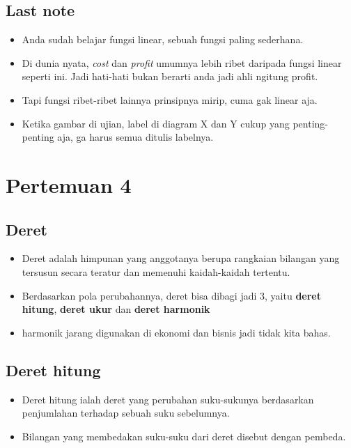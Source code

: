 \documentclass[
  letterpaper,
  DIV=11,
  numbers=noendperiod]{scrartcl}
\begin{document}
\subsection{Last note}\label{last-note}

\begin{itemize}
\item
  Anda sudah belajar fungsi linear, sebuah fungsi paling sederhana.
\item
  Di dunia nyata, \emph{cost} dan \emph{profit} umumnya lebih ribet
  daripada fungsi linear seperti ini. Jadi hati-hati bukan berarti anda
  jadi ahli ngitung profit.
\item
  Tapi fungsi ribet-ribet lainnya prinsipnya mirip, cuma gak linear aja.
\item
  Ketika gambar di ujian, label di diagram X dan Y cukup yang
  penting-penting aja, ga harus semua ditulis labelnya.
\end{itemize}

\section{Pertemuan 4}\label{pertemuan-4}

\subsection{Deret}\label{deret}

\begin{itemize}
\item
  Deret adalah himpunan yang anggotanya berupa rangkaian bilangan yang
  tersusun secara teratur dan memenuhi kaidah-kaidah tertentu.
\item
  Berdasarkan pola perubahannya, deret bisa dibagi jadi 3, yaitu
  \textbf{deret hitung}, \textbf{deret ukur} dan \textbf{deret harmonik}
\item
  harmonik jarang digunakan di ekonomi dan bisnis jadi tidak kita bahas.
\end{itemize}

\subsection{Deret hitung}\label{deret-hitung}

\begin{itemize}
\item
  Deret hitung ialah deret yang perubahan suku-sukunya berdasarkan
  penjumlahan terhadap sebuah suku sebelumnya.
\item
  Bilangan yang membedakan suku-suku dari deret disebut dengan pembeda.
\end{itemize}
\end{document}
